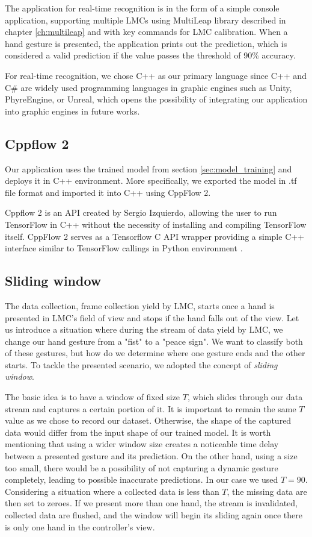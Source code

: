 The application for real-time recognition is in the form of a simple console application, supporting multiple LMCs using MultiLeap \cite{tomasMultileap} library described in chapter \ref{ch:multileap} and with key commands for LMC calibration. When a hand gesture is presented, the application prints out the prediction, which is considered a valid prediction if the value passes the threshold of 90\% accuracy.  

For real-time recognition, we chose C++ as our primary language since C++ and C\# are widely used programming languages in graphic engines such as Unity, PhyreEngine, or Unreal, which opens the possibility of integrating our application into graphic engines in future works.

\subsection{Cppflow 2}

Our application uses the trained model from section \ref{sec:model_training} and deploys it in C++ environment. More specifically, we exported the model in .tf file format and imported it into C++ using CppFlow 2.

Cppflow 2 is an API created by Sergio Izquierdo, allowing the user to run TensorFlow in C++ without the necessity of installing and compiling TensorFlow itself. CppFlow 2 serves as a Tensorflow C API wrapper providing a simple C++ interface similar to TensorFlow callings in Python environment \cite{cppflow}. 

\subsection{Sliding window}

The data collection, frame collection yield by LMC, starts once a hand is presented in LMC's field of view and stops if the hand falls out of the view. Let us introduce a situation where during the stream of data yield by LMC, we change our hand gesture from a "fist" to a "peace sign". We want to classify both of these gestures, but how do we determine where one gesture ends and the other starts. To tackle the presented scenario, we adopted the concept of \textit{sliding window}.

The basic idea is to have a window of fixed size $T$, which slides through our data stream and captures a certain portion of it. It is important to remain the same $T$ value as we chose to record our dataset. Otherwise, the shape of the captured data would differ from the input shape of our trained model. It is worth mentioning that using a wider window size creates a noticeable time delay between a presented gesture and its prediction. On the other hand, using a size too small, there would be a possibility of not capturing a dynamic gesture completely, leading to possible inaccurate predictions. In our case we used $T = 90$. Considering a situation where a collected data is less than $T$, the missing data are then set to zeroes. If we present more than one hand, the stream is invalidated, collected data are flushed, and the window will begin its sliding again once there is only one hand in the controller's view.

